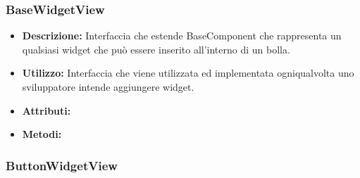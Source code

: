 \subsubsection{BaseWidgetView}
\begin{itemize}
\item \textbf{Descrizione:} Interfaccia che estende BaseComponent che rappresenta un qualsiasi widget che può essere inserito all'interno di un bolla.
\item \textbf{Utilizzo:} Interfaccia che viene utilizzata ed implementata ogniqualvolta uno sviluppatore intende aggiungere widget.
\item \textbf{Attributi:}
\item \textbf{Metodi:}
\end{itemize}

\subsubsection{ButtonWidgetView}
